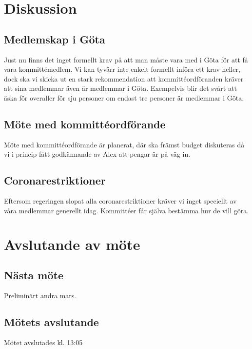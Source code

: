 \documentclass[protokoll]{dvd}
\begin{document}
\section{Diskussion}

    \subsection*{Medlemskap i Göta}
    Just nu finns det inget formellt krav på att man måste vara med i Göta för att få vara kommittémedlem.
    Vi kan tyvärr inte enkelt formellt införa ett krav heller, dock ska vi skicka ut en stark rekommendation att kommittéordföranden kräver att sina medlemmar även är medlemmar i Göta.
    Exempelvis blir det svårt att äska för overaller för sju personer om endast tre personer är medlemmar i Göta.

    \subsection*{Möte med kommittéordförande}
    Möte med kommittéordförande är planerat, där ska främst budget diskuteras då vi i princip fått godkännande av Alex att pengar är på väg in.

    \subsection*{Coronarestriktioner}
    Eftersom regeringen slopat alla coronarestriktioner kräver vi inget speciellt av våra medlemmar generellt idag. Kommittéer får själva bestämma hur de vill göra.

\newpage

\newpage

\newpage

\section{Avslutande av möte}


    \subsection{Nästa möte}
    Preliminärt andra mars.

    \subsection{Mötets avslutande}
    Mötet avslutades kl. 13:05

\styrelsesignaturer
\end{document}
